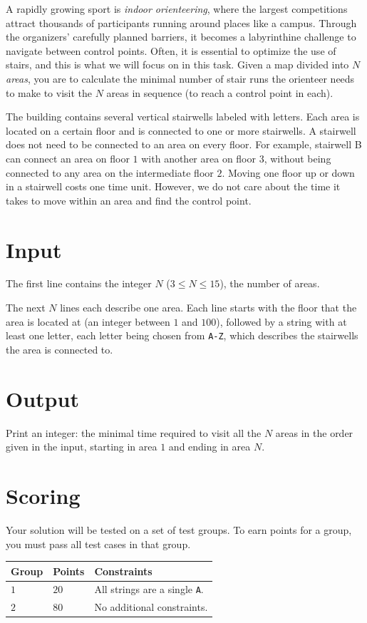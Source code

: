 A rapidly growing sport is \emph{indoor orienteering}, where the largest competitions attract
thousands of participants running around places like a campus. Through the organizers' carefully
planned barriers, it becomes a labyrinthine challenge to navigate between control points. Often,
it is essential to optimize the use of stairs, and this is what we will focus on in this task.
Given a map divided into $N$ \emph{areas}, you are to calculate the minimal number of stair runs
the orienteer needs to make to visit the $N$ areas in sequence (to reach a control point in each).

The building contains several vertical stairwells labeled with letters. Each area is located on
a certain floor and is connected to one or more stairwells. A stairwell does not need to be
connected to an area on every floor. For example, stairwell B can connect an area on floor $1$
with another area on floor $3$, without being connected to any area on the intermediate floor $2$.
Moving one floor up or down in a stairwell costs one time unit. However, we do not care about the
time it takes to move within an area and find the control point.

\section*{Input}
The first line contains the integer $N$ ($3\le N \le 15$), the number of areas.

The next $N$ lines each describe one area.
Each line starts with the floor that the area is located at (an integer between $1$ and $100$), 
followed by a string with at least one letter, each letter being chosen from \texttt{A-Z},
which describes the stairwells the area is connected to.


\section*{Output}
Print an integer: the minimal time required to visit all the $N$ areas in the order given in the input, 
starting in area $1$ and ending in area $N$.


\section*{Scoring}
Your solution will be tested on a set of test groups.
To earn points for a group, you must pass all test cases in that group.

\noindent
\begin{tabular}{| l | l | p{12cm} |}
  \hline
  \textbf{Group} & \textbf{Points} & \textbf{Constraints} \\ \hline
  $1$    & $20$      & All strings are a single \texttt{A}. \\ \hline
  $2$    & $80$      & No additional constraints. \\ \hline
\end{tabular}

